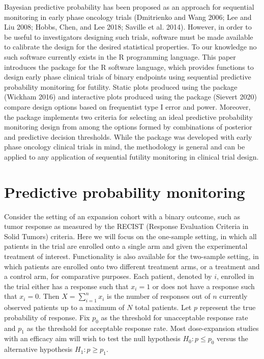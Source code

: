 Bayesian predictive probability has been proposed as an approach for sequential monitoring in early phase oncology trials (Dmitrienko and Wang 2006; Lee and Liu 2008; Hobbs, Chen, and Lee 2018; Saville et al. 2014). However, in order to be useful to investigators designing such trials, software must be made available to calibrate the design for the desired statistical properties. To our knowledge no such software currently exists in the R programming language. This paper introduces the  package for the R software language, which provides functions to design early phase clinical trials of binary endpoints using sequential predictive probability monitoring for futility. Static plots produced using the  package (Wickham 2016) and interactive plots produced using the  package (Sievert 2020) compare design options based on frequentist type I error and power. Moreover, the  package implements two criteria for selecting an ideal predictive probability monitoring design from among the options formed by combinations of posterior and predictive decision thresholds. While the  package was developed with early phase oncology clinical trials in mind, the methodology is general and can be applied to any application of sequential futility monitoring in clinical trial design.

\hypertarget{predictive-probability-monitoring}{%
\section{Predictive probability monitoring}\label{predictive-probability-monitoring}}

Consider the setting of an expansion cohort with a binary outcome, such as tumor response as measured by the RECIST (Response Evaluation Criteria in Solid Tumors) criteria. Here we will focus on the one-sample setting, in which all patients in the trial are enrolled onto a single arm and given the experimental treatment of interest. Functionality is also available for the two-sample setting, in which patients are enrolled onto two different treatment arms, or a treatment and a control arm, for comparative purposes. Each patient, denoted by \(i\), enrolled in the trial either has a response such that \(x_i = 1\) or does not have a response such that \(x_i = 0\). Then \(X = \sum_{i=1}^n x_i\) is the number of responses out of \(n\) currently observed patients up to a maximum of \(N\) total patients. Let \(p\) represent the true probability of response. Fix \(p_0\) as the threshold for unacceptable response rate and \(p_1\) as the threshold for acceptable response rate. Most dose-expansion studies with an efficacy aim will wish to test the null hypothesis \(H_0: p \leq p_0\) versus the alternative hypothesis \(H_1: p \geq p_1\).

